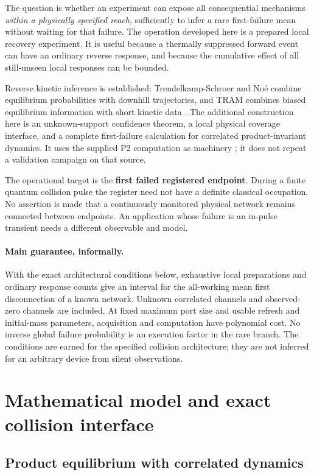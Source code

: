 \documentclass[10pt,a4paper]{article}
\theoremstyle{definition}\newtheorem{assumption}[theorem]{Assumption}
\begin{document}
The question is whether an experiment can expose all consequential mechanisms \emph{within a physically specified reach}, sufficiently to infer a rare first-failure mean without waiting for that failure. The operation developed here is a prepared local recovery experiment. It is useful because a thermally suppressed forward event can have an ordinary reverse response, and because the cumulative effect of all still-unseen local responses can be bounded.

Reverse kinetic inference is established: Trendelkamp-Schroer and No\'e combine equilibrium probabilities with downhill trajectories, and TRAM combines biased equilibrium information with short kinetic data \cite{prx2016,tram}. The additional construction here is an unknown-support confidence theorem, a local physical coverage interface, and a complete first-failure calculation for correlated product-invariant dynamics. It uses the supplied P2 computation as machinery \cite{p2}; it does not repeat a validation campaign on that source.

The operational target is the \textbf{first failed registered endpoint}. During a finite quantum collision pulse the register need not have a definite classical occupation. No assertion is made that a continuously monitored physical network remains connected between endpoints. An application whose failure is an in-pulse transient needs a different observable and model.

\paragraph{Main guarantee, informally.}
With the exact architectural conditions below, exhaustive local preparations and ordinary response counts give an interval for the all-working mean first disconnection of a known network. Unknown correlated channels and observed-zero channels are included. At fixed maximum port size and usable refresh and initial-mass parameters, acquisition and computation have polynomial cost. No inverse global failure probability is an execution factor in the rare branch. The conditions are earned for the specified collision architecture; they are not inferred for an arbitrary device from silent observations.

\section{Mathematical model and exact collision interface}

\subsection{Product equilibrium with correlated dynamics}
\end{document}
